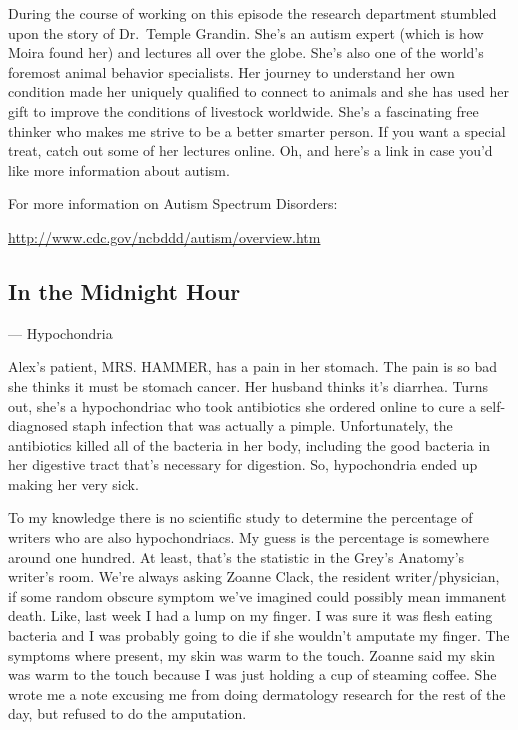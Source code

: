 \documentclass[12pt,a4paper,onecolumn]{article}
\begin{document}
During the course of working on this episode the research department stumbled upon the story of
Dr.~Temple Grandin. She's an autism expert (which is how Moira found her) and lectures all over the
globe. She's also one of the world's foremost animal behavior specialists. Her journey to understand
her own condition made her uniquely qualified to connect to animals and she has used her gift to
improve the conditions of livestock worldwide. She's a fascinating free thinker who makes me strive
to be a better smarter person. If you want a special treat, catch out some of her lectures online.
Oh, and here's a link in case you'd like more information about autism.

For more information on Autism Spectrum Disorders:

\url{http://www.cdc.gov/ncbddd/autism/overview.htm}

\subsection{In the Midnight Hour}
\begin{flushright}
--- Hypochondria
\end{flushright}
 
Alex's patient, MRS. HAMMER, has a pain in her stomach. The pain is so bad she thinks it must be
stomach cancer. Her husband thinks it's diarrhea\cite{diarrhea}. Turns out, she's a hypochondriac
who took antibiotics\cite{antibiotic} she ordered online to cure a self-diagnosed staph infection
that was actually a pimple\cite{pimple}. Unfortunately, the antibiotics killed all of the bacteria
in her body, including the good bacteria in her digestive tract that's necessary for digestion. So,
hypochondria ended up making her very sick.

To my knowledge there is no scientific study to determine the percentage of writers who are also
hypochondriacs. My guess is the percentage is somewhere around one hundred. At least, that's the
statistic in the Grey's Anatomy's writer's room. We're always asking Zoanne Clack, the resident
writer/physician, if some random obscure symptom we've imagined could possibly mean
immanent\cite{immanent} death. Like, last week I had a lump on my finger. I was sure it was flesh
eating bacteria and I was probably going to die if she wouldn't amputate\cite{amputate} my finger.
The symptoms where present, my skin was warm to the touch. Zoanne said my skin was warm to the touch
because I was just holding a cup of steaming coffee. She wrote me a note excusing me from doing
dermatology\cite{dermatology} research for the rest of the day, but refused to do the amputation.
\end{document}
